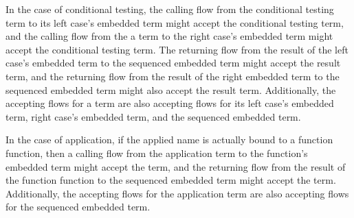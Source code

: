 \documentclass[letterpaper, 11pt]{extarticle}
\begin{document}
In the case of conditional testing, the calling flow from the conditional testing term to
its left case's embedded term might accept the conditional testing term, and
the calling flow from the a term to
the right case's embedded term might accept the conditional testing term.
The returning flow from the result of the
left case's embedded term to the sequenced embedded term might accept the result term,
and the returning flow from the result of the right embedded term to the sequenced embedded term
might also accept the result term.  Additionally, the accepting flows for a term are also
accepting flows for its left case's embedded term, right case's embedded term,
and the sequenced embedded term.   

In the case of application, if the applied name is actually bound to a function
function, then a calling flow from the application term to the function's embedded term
might accept the term, and the returning flow from the result of the function
function to the sequenced embedded term might accept the term.
Additionally, the accepting flows for the application term are also
accepting flows for the sequenced embedded term. 
\end{document}
